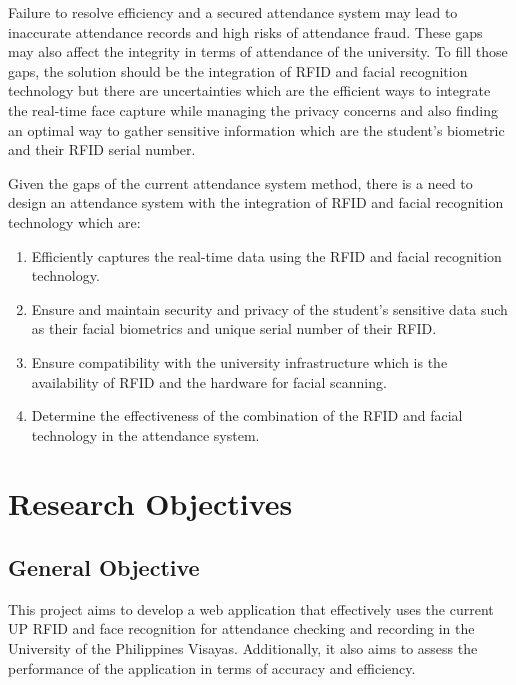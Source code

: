 Failure to resolve efficiency and a secured attendance system may lead to inaccurate attendance records and high risks of attendance fraud. These gaps may also affect the integrity in terms of attendance of the university. To fill those gaps, the solution should be the integration of RFID and facial recognition technology but there are uncertainties which are the efficient ways to integrate the real-time face capture while  managing the privacy concerns and also finding an optimal way to gather sensitive information which are the student’s biometric and their RFID serial number. 

Given the gaps of the current attendance system method, there is a need to design an attendance system with the integration of RFID and facial recognition technology which are:

\begin{enumerate}
	\item Efficiently captures the real-time data using the RFID and facial recognition technology.
	\item  Ensure and maintain security and privacy of the student’s sensitive data such as their facial biometrics and unique serial number of their RFID.  
	\item Ensure compatibility with the university infrastructure which is the availability of RFID and the hardware for facial scanning. 
	\item 	Determine the effectiveness of the combination of the RFID and facial technology in the attendance system. 
\end{enumerate}


\section{Research Objectives}
\label{sec:researchobjectives}

\subsection{General Objective}
\label{sec:generalobjective}

This project aims to develop a web application that effectively uses the current UP RFID and face recognition for attendance checking and recording in the University of the Philippines Visayas. Additionally, it also aims to assess the performance of the application in terms of accuracy and efficiency.



